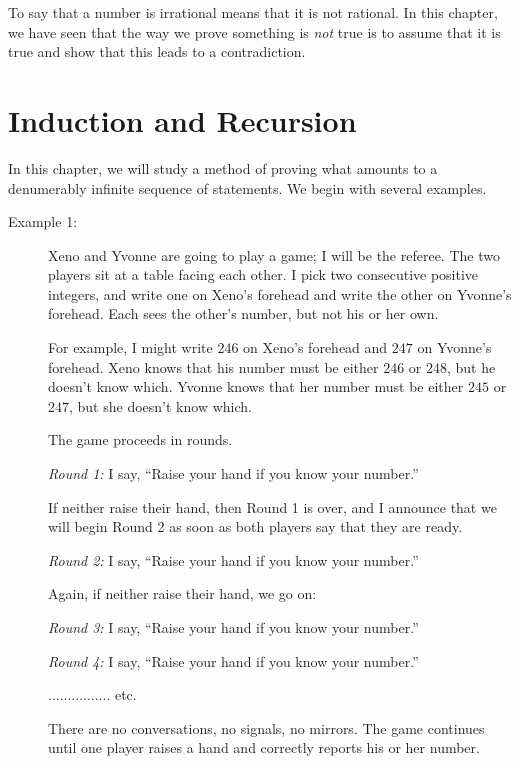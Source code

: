 \documentclass{article}
\newcommand{\0}{\mathbf 0}
\newcommand{\1}{\mathbf 1}
\begin{document}
To say that a number is irrational means that it is not rational. In this chapter, we have seen that the way we prove something is \emph{not} true is to assume that it is true and show that this leads to a contradiction.




\newpage

\section{Induction and Recursion}


In this chapter, we will study a method of proving what amounts to a denumerably infinite sequence of statements. We begin with several examples.

\begin{description}

  \item[Example 1:] Xeno and Yvonne are going to play a game; I will be the referee. The two players sit at a table facing each other. I pick two consecutive positive integers, and write one on Xeno's forehead and write the other on Yvonne's forehead. Each sees the other's number, but not his or her own.

    For example, I might write $246$ on Xeno's forehead and $247$ on Yvonne's forehead. Xeno knows that his number must be either $246$ or $248$, but he doesn't know which. Yvonne knows that her number must be either $245$ or $247$, but she doesn't know which.

    The game proceeds in rounds.

    \emph{Round 1:} I say, ``Raise your hand if you know your number.''

    If neither raise their hand, then Round 1 is over, and I announce that we will begin Round 2 as soon as both players say that they are ready.

    \emph{Round 2:} I say, ``Raise your hand if you know your number.''

    Again, if neither raise their hand, we go on:

    \emph{Round 3:} I say, ``Raise your hand if you know your number.''

    \emph{Round 4:} I say, ``Raise your hand if you know your number.''

    ................ etc.

    There are no conversations, no signals, no mirrors. The game continues until one player raises a hand and correctly reports his or her number.


\end{description}
\end{document}

